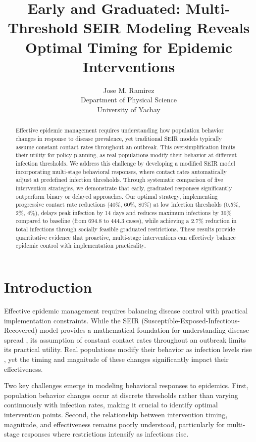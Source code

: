 \documentclass{article} %
\title{Early and Graduated: Multi-Threshold SEIR Modeling Reveals Optimal Timing for Epidemic Interventions}
\author{Jose M. Ramirez\\
Department of Physical Science\\
University of Yachay\\
}
\begin{document}
\maketitle

\begin{abstract}
Effective epidemic management requires understanding how population behavior changes in response to disease prevalence, yet traditional SEIR models typically assume constant contact rates throughout an outbreak. This oversimplification limits their utility for policy planning, as real populations modify their behavior at different infection thresholds. We address this challenge by developing a modified SEIR model incorporating multi-stage behavioral responses, where contact rates automatically adjust at predefined infection thresholds. Through systematic comparison of five intervention strategies, we demonstrate that early, graduated responses significantly outperform binary or delayed approaches. Our optimal strategy, implementing progressive contact rate reductions (40\%, 60\%, 80\%) at low infection thresholds (0.5\%, 2\%, 4\%), delays peak infection by 14 days and reduces maximum infections by 36\% compared to baseline (from 694.8 to 444.3 cases), while achieving a 2.7\% reduction in total infections through socially feasible graduated restrictions. These results provide quantitative evidence that proactive, multi-stage interventions can effectively balance epidemic control with implementation practicality.
\end{abstract}

\section{Introduction}
\label{sec:intro}

Effective epidemic management requires balancing disease control with practical implementation constraints. While the SEIR (Susceptible-Exposed-Infectious-Recovered) model provides a mathematical foundation for understanding disease spread \citep{hethcote2000mathematics}, its assumption of constant contact rates throughout an outbreak limits its practical utility. Real populations modify their behavior as infection levels rise \citep{he2020seir}, yet the timing and magnitude of these changes significantly impact their effectiveness.

Two key challenges emerge in modeling behavioral responses to epidemics. First, population behavior changes occur at discrete thresholds rather than varying continuously with infection rates, making it crucial to identify optimal intervention points. Second, the relationship between intervention timing, magnitude, and effectiveness remains poorly understood, particularly for multi-stage responses where restrictions intensify as infections rise.
\end{document}
